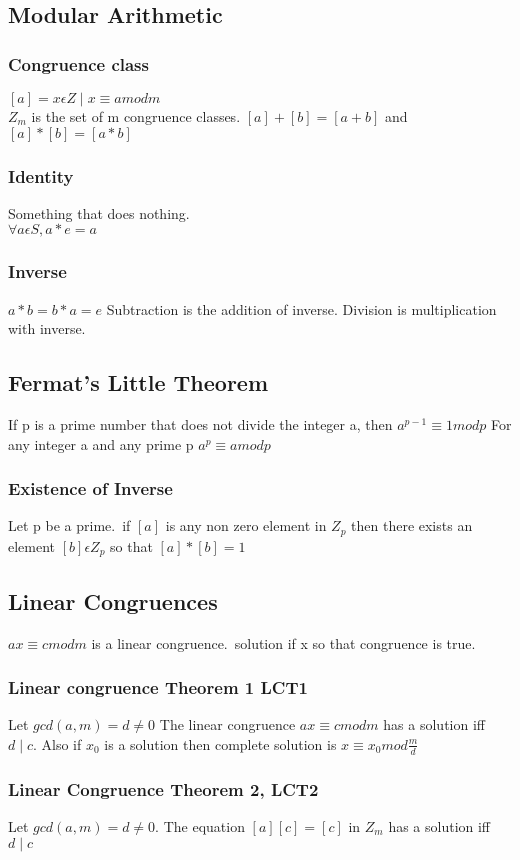 \documentclass[12pt]{article}
\begin{document}
\subsection{Modular Arithmetic}
\subsubsection{Congruence class}
$[a]={x\epsilon Z\mid x\equiv a mod m}$
\\
$Z_m$ is the set of m congruence classes. $[a]+[b]=[a+b]$ and $[a]*[b]=[a*b]$
\subsubsection{Identity}
Something that does nothing. \\ $\forall a \epsilon S, a * e=a$
\subsubsection{Inverse}
$a*b=b*a=e$
Subtraction is the addition of inverse.
Division is multiplication with inverse.
\subsection{Fermat's Little Theorem}
If p is a prime number that does not divide the integer a, then $a^{p-1}
\equiv 1 mod p$
For any integer a and any prime p $a^p\equiv a mod p$
\subsubsection{Existence of Inverse}
Let p be a prime.\ if $[a]$ is any non zero element in $Z_p$ then there exists an
element $[b]\epsilon Z_p$ so that $[a]*[b]=1$
\subsection{Linear Congruences}
$ax\equiv c mod m$ is a linear congruence.\ solution if x so that congruence is
true.
\subsubsection{Linear congruence Theorem 1 LCT1}
Let $gcd(a,m)=d\neq 0$ The linear congruence $ax\equiv c mod m$ has a solution
iff $d\mid c$. Also if $x_0$ is a solution then complete solution is $x\equiv x_0
mod \frac{m}{d}$
\subsubsection{Linear Congruence Theorem 2, LCT2}
Let $gcd(a,m)=d\neq 0$. The equation $[a][c]=[c]$ in $Z_m$ has a solution iff
$d\mid c$
\end{document}
